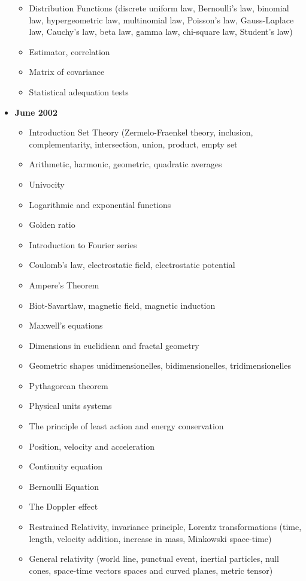 \documentclass[12pt,a4paper,twoside,openright]{report}
\theoremstyle{definition}
\theoremstyle{itexmp}
\numberwithin{equation}{section}
\begin{document}
\begin{itemize}
\begin{itemize}[noitemsep]
			\item Distribution Functions (discrete uniform law, Bernoulli's law, binomial law, hypergeometric law, multinomial law, Poisson's law, Gauss-Laplace law, Cauchy's law, beta law, gamma law, chi-square law, Student's law)
			\item Estimator, correlation
			\item Matrix of covariance
			\item Statistical adequation tests
		\end{itemize}
		\item \textbf{June 2002}
			\begin{itemize}[noitemsep]
				\item Introduction Set Theory (Zermelo-Fraenkel theory, inclusion, complementarity, intersection, union, product, empty set
				\item Arithmetic, harmonic, geometric, quadratic averages
				\item Univocity
				\item Logarithmic and exponential functions
				\item Golden ratio
				\item Introduction to Fourier series
				\item Coulomb's law, electrostatic field, electrostatic potential
				\item Ampere's Theorem
				\item Biot-Savartlaw, magnetic field, magnetic induction
				\item Maxwell's equations
				\item Dimensions in euclidiean and fractal geometry
				\item Geometric shapes unidimensionelles, bidimensionelles, tridimensionelles
				\item Pythagorean theorem
				\item Physical units systems
				\item The principle of least action and energy conservation
				\item Position, velocity and acceleration
				\item Continuity equation
				\item Bernoulli Equation
				\item The Doppler effect
				\item Restrained Relativity, invariance principle, Lorentz transformations (time, length, velocity addition, increase in mass, Minkowski space-time)
				\item General relativity (world line, punctual event, inertial particles, null cones, space-time vectors spaces and curved planes, metric tensor)

\end{itemize}
\end{itemize}
\end{document}
